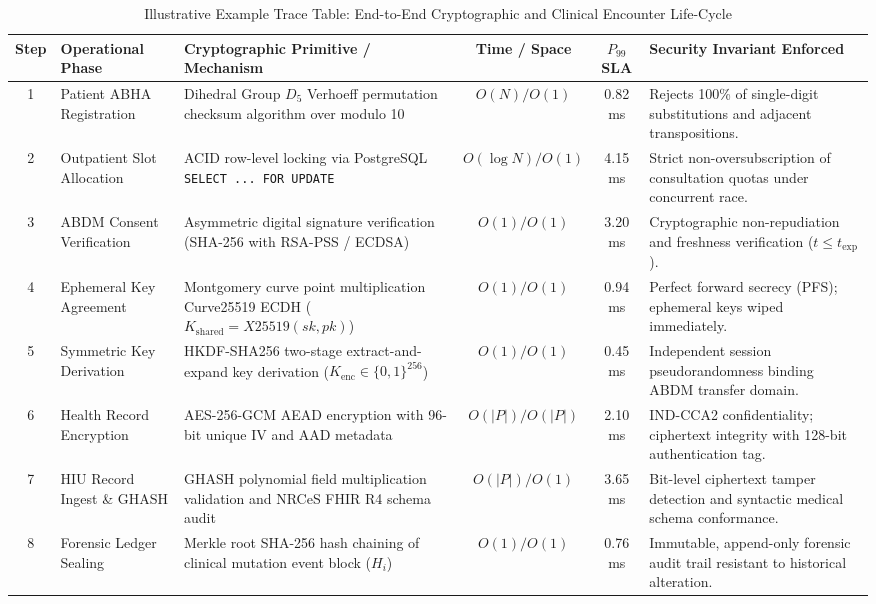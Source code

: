 \documentclass[journal,twocolumn]{IEEEtran}
\begin{document}
\begin{table}[t]
\caption{Illustrative Example Trace Table: End-to-End Cryptographic and Clinical Encounter Life-Cycle}
\label{tab:encounter_trace}
\centering
\small
\begin{tabularx}{\textwidth}{clXccX}
\toprule
\textbf{Step} & \textbf{Operational Phase} & \textbf{Cryptographic Primitive / Mechanism} & \textbf{Time / Space} & \textbf{$P_{99}$ SLA} & \textbf{Security Invariant Enforced} \\
\midrule
1 & Patient ABHA Registration & Dihedral Group $D_5$ Verhoeff permutation checksum algorithm over modulo 10 & $O(N) / O(1)$ & 0.82 ms & Rejects 100\% of single-digit substitutions and adjacent transpositions. \\
2 & Outpatient Slot Allocation & ACID row-level locking via PostgreSQL \texttt{SELECT ... FOR UPDATE} & $O(\log N) / O(1)$ & 4.15 ms & Strict non-oversubscription of consultation quotas under concurrent race. \\
3 & ABDM Consent Verification & Asymmetric digital signature verification (SHA-256 with RSA-PSS / ECDSA) & $O(1) / O(1)$ & 3.20 ms & Cryptographic non-repudiation and freshness verification ($t \le t_{\text{exp}}$). \\
4 & Ephemeral Key Agreement & Montgomery curve point multiplication Curve25519 ECDH ($K_{\text{shared}} = X25519(sk, pk)$) & $O(1) / O(1)$ & 0.94 ms & Perfect forward secrecy (PFS); ephemeral keys wiped immediately. \\
5 & Symmetric Key Derivation & HKDF-SHA256 two-stage extract-and-expand key derivation ($K_{\text{enc}} \in \{0,1\}^{256}$) & $O(1) / O(1)$ & 0.45 ms & Independent session pseudorandomness binding ABDM transfer domain. \\
6 & Health Record Encryption & AES-256-GCM AEAD encryption with 96-bit unique IV and AAD metadata & $O(|P|) / O(|P|)$ & 2.10 ms & IND-CCA2 confidentiality; ciphertext integrity with 128-bit authentication tag. \\
7 & HIU Record Ingest \& GHASH & GHASH polynomial field multiplication validation and NRCeS FHIR R4 schema audit & $O(|P|) / O(1)$ & 3.65 ms & Bit-level ciphertext tamper detection and syntactic medical schema conformance. \\
8 & Forensic Ledger Sealing & Merkle root SHA-256 hash chaining of clinical mutation event block ($H_i$) & $O(1) / O(1)$ & 0.76 ms & Immutable, append-only forensic audit trail resistant to historical alteration. \\
\bottomrule
\end{tabularx}
\end{table}
\end{document}
